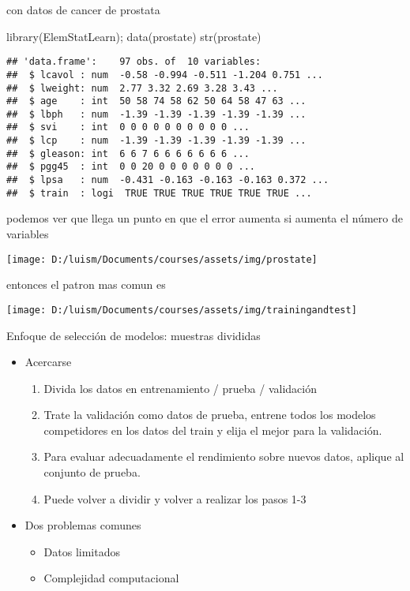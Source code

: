 \documentclass[
]{article}
\newenvironment{Shaded}{\begin{snugshade}}{\end{snugshade}}
\newcommand{\FunctionTok}[1]{\textcolor[rgb]{0.00,0.00,0.00}{#1}}
\newcommand{\NormalTok}[1]{#1}
\providecommand{\tightlist}{%
  \setlength{\itemsep}{0pt}\setlength{\parskip}{0pt}}
\begin{document}
con datos de cancer de prostata

\begin{Shaded}
\begin{Highlighting}[]
\FunctionTok{library}\NormalTok{(ElemStatLearn); }\FunctionTok{data}\NormalTok{(prostate)}
\FunctionTok{str}\NormalTok{(prostate)}
\end{Highlighting}
\end{Shaded}

\begin{verbatim}
## 'data.frame':    97 obs. of  10 variables:
##  $ lcavol : num  -0.58 -0.994 -0.511 -1.204 0.751 ...
##  $ lweight: num  2.77 3.32 2.69 3.28 3.43 ...
##  $ age    : int  50 58 74 58 62 50 64 58 47 63 ...
##  $ lbph   : num  -1.39 -1.39 -1.39 -1.39 -1.39 ...
##  $ svi    : int  0 0 0 0 0 0 0 0 0 0 ...
##  $ lcp    : num  -1.39 -1.39 -1.39 -1.39 -1.39 ...
##  $ gleason: int  6 6 7 6 6 6 6 6 6 6 ...
##  $ pgg45  : int  0 0 20 0 0 0 0 0 0 0 ...
##  $ lpsa   : num  -0.431 -0.163 -0.163 -0.163 0.372 ...
##  $ train  : logi  TRUE TRUE TRUE TRUE TRUE TRUE ...
\end{verbatim}

podemos ver que llega un punto en que el error aumenta si aumenta el
número de variables

\begin{center}\texttt{[image: D:/luism/Documents/courses/assets/img/prostate]} \end{center}

entonces el patron mas comun es

\begin{center}\texttt{[image: D:/luism/Documents/courses/assets/img/trainingandtest]} \end{center}

Enfoque de selección de modelos: muestras divididas

\begin{itemize}
\tightlist
\item
  Acercarse

  \begin{enumerate}
  \def\labelenumi{\arabic{enumi}.}
  \tightlist
  \item
    Divida los datos en entrenamiento / prueba / validación
  \item
    Trate la validación como datos de prueba, entrene todos los modelos
    competidores en los datos del train y elija el mejor para la
    validación.
  \item
    Para evaluar adecuadamente el rendimiento sobre nuevos datos,
    aplique al conjunto de prueba.
  \item
    Puede volver a dividir y volver a realizar los pasos 1-3
  \end{enumerate}
\item
  Dos problemas comunes

  \begin{itemize}
  \tightlist
  \item
    Datos limitados
  \item
    Complejidad computacional
  \end{itemize}
\end{itemize}
\end{document}
